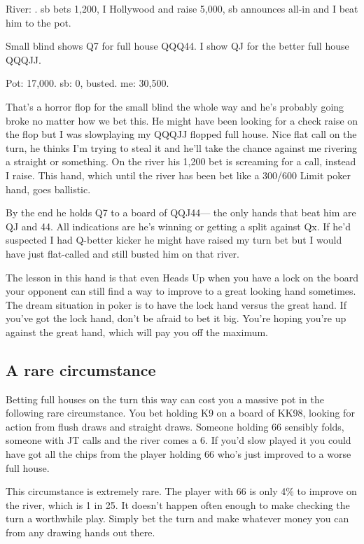 River: \fourc. sb bets 1,200, I Hollywood and raise 5,000, sb announces all-in
and I beat him to the pot.

Small blind shows Q7 for full house QQQ44. I show QJ for the better 
full house QQQJJ.

Pot: 17,000. sb: 0, busted. me: 30,500.

That's a horror flop for the small blind the whole way and he's probably
going broke no matter how we bet this. He might have been looking for
a check raise on the flop but I was slowplaying my QQQJJ flopped full house.
Nice flat call on the turn, he thinks I'm trying to steal it and he'll take
the chance against me rivering a straight or something. On the river his
1,200 bet is screaming for a call, instead I raise. This hand, which until
the river has been bet like a 300/600 Limit poker hand, goes ballistic.

By the end he holds Q7 to a board of QQJ44--- the only hands that beat him 
are QJ and 44. All indications are he's winning or getting a split against Qx. 
If he'd suspected I had Q-better kicker he might have raised my turn bet but I
would have just flat-called and still busted him on that river.

The lesson in this hand is that even Heads Up when you have a lock on
the board your opponent can still find a way to improve to a great
looking hand sometimes. The dream situation in poker is to have the lock 
hand versus the great hand. If you've got the lock hand, don't be afraid
to bet it big. You're hoping you're up against the great hand, which will pay
you off the maximum.

\subsection*{A rare circumstance}

Betting full houses on the turn this way can cost you a massive pot in
the following rare circumstance. You bet holding K9 on a board
of KK98, looking for action from flush draws and straight draws. Someone
holding 66 sensibly folds, someone with JT calls and the river comes
a 6. If you'd slow played it you could have got all the chips from
the player holding 66 who's just improved to a worse full house.

This circumstance is extremely rare. The player with 66 is only 4\% to
improve on the river, which is 1 in 25. It doesn't happen often enough
to make checking the turn a worthwhile play. Simply bet
the turn and make whatever money you can from any drawing hands
out there.

